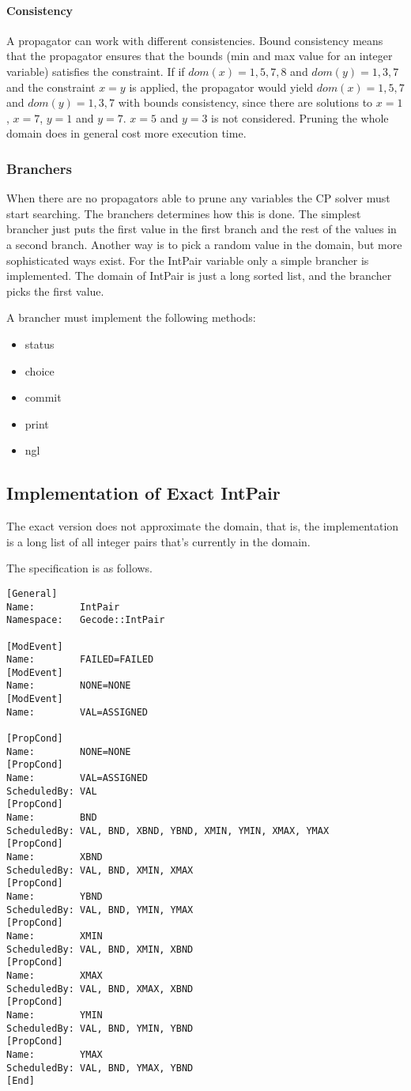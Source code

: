 \documentclass[a4paper,11pt]{article}
\begin{document}
\paragraph{Consistency}
A propagator can work with different consistencies. Bound consistency means that the propagator ensures that the bounds (min and max value for an integer variable) satisfies the constraint. If if $dom(x)={1,5,7,8}$ and $dom(y)={1,3,7}$ and the constraint $x=y$ is applied, the propagator would yield $dom(x)={1,5,7}$ and $dom(y)={1,3,7}$ with bounds consistency, since there are solutions to $x=1$, $x=7$, $y=1$ and $y=7$. $x=5$ and $y=3$ is not considered. Pruning the whole domain does in general cost more execution time.

\subsubsection{Branchers}
When there are no propagators able to prune any variables the CP solver must start searching. The branchers determines how this is done. The simplest brancher just puts the first value in the first branch and the rest of the values in a second branch. Another way is to pick a random value in the domain, but more sophisticated ways exist. For the IntPair variable only a simple brancher is implemented. The domain of IntPair is just a long sorted list, and the brancher picks the first value.

A brancher must implement the following methods:
\begin{itemize}
\item{status}
\item{choice}
\item{commit}
\item{print}
\item{ngl}
\end{itemize}

\subsection{Implementation of Exact IntPair}
The exact version does not approximate the domain, that is, the implementation is a long list of all integer pairs that's currently in the domain.

The specification is as follows.
\begin{lstlisting}[frame=single]
[General]
Name:        IntPair
Namespace:   Gecode::IntPair

[ModEvent]
Name:        FAILED=FAILED
[ModEvent]
Name:        NONE=NONE
[ModEvent]
Name:        VAL=ASSIGNED

[PropCond]
Name:        NONE=NONE
[PropCond]
Name:        VAL=ASSIGNED
ScheduledBy: VAL
[PropCond]
Name:        BND
ScheduledBy: VAL, BND, XBND, YBND, XMIN, YMIN, XMAX, YMAX
[PropCond]
Name:        XBND
ScheduledBy: VAL, BND, XMIN, XMAX
[PropCond]
Name:        YBND
ScheduledBy: VAL, BND, YMIN, YMAX
[PropCond]
Name:        XMIN
ScheduledBy: VAL, BND, XMIN, XBND
[PropCond]
Name:        XMAX
ScheduledBy: VAL, BND, XMAX, XBND
[PropCond]
Name:        YMIN
ScheduledBy: VAL, BND, YMIN, YBND
[PropCond]
Name:        YMAX
ScheduledBy: VAL, BND, YMAX, YBND
[End]
\end{lstlisting}
\end{document}
